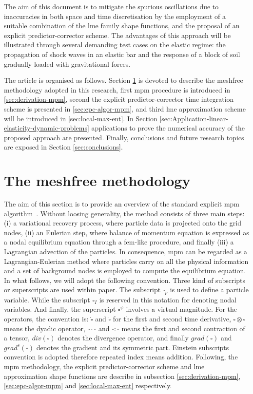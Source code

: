 \documentclass[preprint,12pt,a4paper]{elsarticle}
\newcommand{\Div}[1]{
  \ensuremath{div({#1})}
}
\newcommand\Grad[1]{grad({#1})}
\newcommand\GradS[1]{grad^s({#1})}
\begin{document}
The aim of this document is to mitigate the spurious oscillations due to
inaccuracies in both space and time discretisation by the employment of a
suitable combination of the \acrshort{lme} family shape functions, and the proposal of an explicit predictor-corrector scheme. The advantages of
this approach will be illustrated through several demanding test cases on the elastic regime: the
propagation of shock waves in an elastic bar and the response of a block of soil gradually loaded with gravitational forces.

The article is organised as follows. Section \ref{sec:meshfree-methodology}
is devoted to describe the meshfree methodology adopted in this
research, first \acrshort{mpm} procedure is introduced in
\ref{sec:derivation-mpm}, second the explicit predictor-corrector
time integration scheme is presented in \ref{sec:epc-algor-mpm}, and
third \acrshort{lme} approximation scheme will be introduced in
\ref{sec:local-max-ent}. In Section
\ref{sec:Application-linear-elasticity-dynamic-problems} applications
to prove the numerical accuracy of the proposed approach are
presented. Finally, conclusions and future research topics are exposed in Section \ref{sec:conclusions}.


\section{The meshfree methodology}
\label{sec:meshfree-methodology}

The aim of this section is to provide an overview of the standard
explicit \acrshort{mpm} algorithm~\cite{Sulsky1994}. Without loosing
generality, the method consists of three main steps: (i) a
variational recovery process, where particle data is projected onto the
grid nodes, (ii) an Eulerian step, where balance of momentum equation
is expressed as a nodal equilibrium equation through a \acrshort{fem}-like
procedure, and finally (iii) a Lagrangian advection of the
particles. In consequence, \acrshort{mpm} can be regarded as a
Lagrangian-Eulerian method where particles carry on all the physical
information and a set of background nodes is employed to
compute the equilibrium equation. In what follows, we will adopt the
following convention. Three kind of subscripts or superscripts are used
within paper. The subscript $\square_p$ is used to define a particle
variable. While the subscript $\square_I$ is reserved in this notation for denoting nodal
variables. And finally, the superscript $\square^{\psi}$ involves a
virtual magnitude. For the operators, the convention is: $\dot{\square}$ and
$\ddot{\square}$ for the first and second time derivative, $\square \otimes
\square$ means the dyadic operator, $\square \cdot \square$ and $\square \colon \square$ means the
first and second contraction of a tensor, $\Div{\square}$ denotes the
divergence operator, and finally $\Grad{\square}$ and $\GradS{\square}$
denotes the gradient and its symmetric part. Einstein subscripts
convention is adopted therefore repeated index means addition. Following, the \acrshort{mpm} methodology, the explicit predictor-corrector scheme and \acrshort{lme} approximation shape functions are describe in subsection \ref{sec:derivation-mpm},\ref{sec:epc-algor-mpm} and \ref{sec:local-max-ent} respectively.
\end{document}
